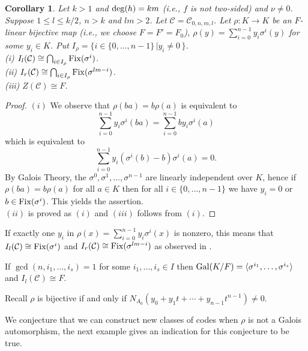 \documentclass[12pt]{amsart}
\theoremstyle{plain}
\newtheorem{corollary}[theorem]{Corollary}
\theoremstyle{definition}
\numberwithin{equation}{section}
\numberwithin{figure}{section}
\begin{document}
\begin{corollary}\label{cor:9II}
Let $k>1$ and ${\rm deg}(h)=km$  (i.e., $f$ is not two-sided) and $\nu\not=0$. Suppose $1\leq l\leq k/2$, $n>k$ and $lm>2$.
Let $\mathcal{C}=\mathcal{C}_{0,n,m,l}$.
Let $\rho:K\to K$ be an $F$-linear bijective map (i.e., we choose $F=F'=F_0$), $\rho(y)= \sum_{i=0}^{n-1}y_i\sigma^i(y)$
 for some $y_i\in K$. Put $I_\rho=\{i\in \{0,\dots, n-1\}\,| y_i\not=0\, \}$.
\\ (i) $I_l(\mathcal{C})\cong \bigcap_{i\in I_\rho} {\rm Fix}(\sigma^i)$.
\\ (ii) $I_r(\mathcal{C}) \cong \bigcap_{i\in I_\rho} {\rm Fix}(\sigma^{lm-i})$.
\\ (iii)  $Z(\mathcal{C})\cong F$.
\end{corollary}

\begin{proof}
$(i)$ We observe that $\rho(b a) = b\rho(a)$  is equivalent to
$$ \sum_{i=0}^{n-1}y_i\sigma^i(ba)= \sum_{i=0}^{n-1} by_i\sigma^i(a)$$
which is equivalent to
$$ \sum_{i=0}^{n-1}y_i (\sigma^i(b)-b) \sigma^i(a)= 0.$$
By Galois Theory, the $\sigma^0,\sigma^1,\dots, \sigma^{n-1}$ are linearly independent over $K$, hence if $\rho(b a) = b\rho(a)$ for all $a\in K$ then for all $i\in \{0,\dots, n-1\}$ we have $y_i=0$ or $b\in {\rm Fix}(\sigma^i)$. This yields the assertion.
\\ $(ii)$ is proved as $(i)$ and $(iii)$ follows from $(i)$.
\end{proof}

If exactly one $y_i$ in $\rho(x)= \sum_{i=0}^{n-1}y_i\sigma^i(x)$ is nonzero, this means that $I_l(\mathcal{C})\cong  {\rm Fix}(\sigma^i)$ and $I_r(\mathcal{C})\cong  {\rm Fix}(\sigma^{lm-i})$ as observed in \cite[Proposition 5.5]{NewS}.

If $\gcd (n,i_1,\dots,i_s)=1$ for some $i_1,\dots,i_s\in I$ then ${\rm Gal}(K/F)=\langle \sigma^{i_1},\dots, \sigma^{i_s}\rangle$ and $I_l(\mathcal{C})\cong F$.

 Recall $\rho$ is bijective  if and only if
 $N_{A_0}(y_0 + y_1 t + \cdots + y_{n-1}t^{n-1})\not=0.$

We conjecture that we can construct new classes of codes when $\rho$ is not a Galois automorphism, the next example gives an indication for this conjecture to be true.
\end{document}
